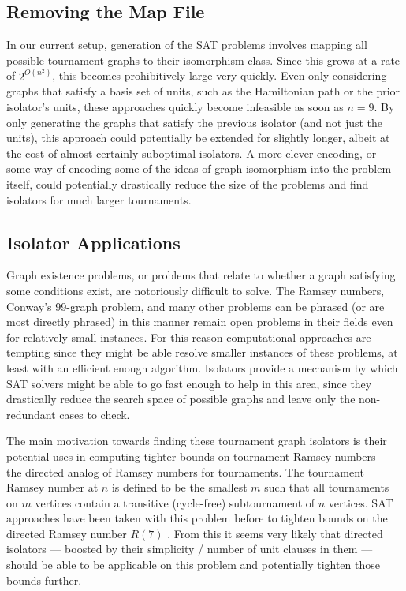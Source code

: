 \documentclass[a4paper,UKenglish,cleveref, autoref, thm-restate]{lipics-v2021}
\begin{document}
\subsection{Removing the Map File}

In our current setup, generation of the SAT problems involves mapping all possible tournament graphs to their isomorphism class.  Since this grows at a rate of $2^{O(n^2)}$, this becomes prohibitively large very quickly.  Even only considering graphs that satisfy a basis set of units, such as the Hamiltonian path or the prior isolator's units, these approaches quickly become infeasible as soon as $n = 9$.  By only generating the graphs that satisfy the previous isolator (and not just the units), this approach could potentially be extended for slightly longer, albeit at the cost of almost certainly suboptimal isolators.  A more clever encoding, or some way of encoding some of the ideas of graph isomorphism into the problem itself, could potentially drastically reduce the size of the problems and find isolators for much larger tournaments.

\subsection{Isolator Applications}

Graph existence problems, or problems that relate to whether a graph satisfying some conditions exist, are notoriously difficult to solve.  The Ramsey numbers, Conway's 99-graph problem, and many other problems can be phrased (or are most directly phrased) in this manner remain open problems in their fields even for relatively small instances.  For this reason computational approaches are tempting since they might be able resolve smaller instances of these problems, at least with an efficient enough algorithm.  Isolators provide a mechanism by which SAT solvers might be able to go fast enough to help in this area, since they drastically reduce the search space of possible graphs and leave only the non-redundant cases to check.

The main motivation towards finding these tournament graph isolators is their potential uses in computing tighter bounds on tournament Ramsey numbers --- the directed analog of Ramsey numbers for tournaments.  The tournament Ramsey number at $n$ is defined to be the smallest $m$ such that all tournaments on $m$ vertices contain a transitive (cycle-free) subtournament of $n$ vertices.  SAT approaches have been taken with this problem before to tighten bounds on the directed Ramsey number $R(7)$ \cite{directedramsey}.  From this it seems very likely that directed isolators --- boosted by their simplicity / number of unit clauses in them --- should be able to be applicable on this problem and potentially tighten those bounds further.
\end{document}
